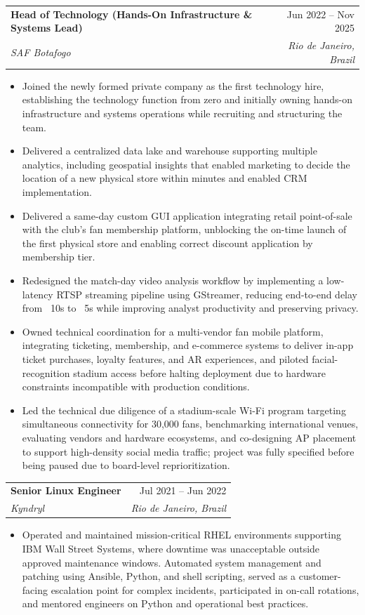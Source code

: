 \documentclass[letterpaper,11pt]{article}
\makeatletter
\newcommand{\resumeItem}[1]{
  \item\small{
    {#1 \vspace{-2pt}}
  }
}
\newcommand{\resumeSubheading}[4]{
  \vspace{-2pt}\item
    \begin{tabular*}{0.97\textwidth}[t]{l@{\extracolsep{\fill}}r}
      \textbf{#1} & #2 \\
      \textit{\small#3} & \textit{\small #4} \\
    \end{tabular*}\vspace{-7pt}
}
\newcommand{\resumeItemListStart}{\begin{itemize}}
\newcommand{\resumeItemListEnd}{\end{itemize}\vspace{-5pt}}
\makeatother
\begin{document}
    \medskip

    \resumeSubheading
      {Head of Technology (Hands-On Infrastructure \& Systems Lead)}{Jun 2022 -- Nov 2025}
      {SAF Botafogo}{Rio de Janeiro, Brazil}
      \resumeItemListStart
        \resumeItem{Joined the newly formed private company as the first technology hire, establishing the technology function from zero and initially owning hands-on infrastructure and systems operations while recruiting and structuring the team.}
        \resumeItem{Delivered a centralized data lake and warehouse supporting multiple analytics, including geospatial insights that enabled marketing to decide the location of a new physical store within minutes and enabled CRM implementation.}
        \resumeItem{Delivered a same-day custom GUI application integrating retail point-of-sale with the club’s fan membership platform, unblocking the on-time launch of the first physical store and enabling correct discount application by membership tier.}
        \resumeItem{Redesigned the match-day video analysis workflow by implementing a low-latency RTSP streaming pipeline using GStreamer, reducing end-to-end delay from ~10s to ~5s while improving analyst productivity and preserving privacy.}
        \resumeItem{Owned technical coordination for a multi-vendor fan mobile platform, integrating ticketing, membership, and e-commerce systems to deliver in-app ticket purchases, loyalty features, and AR experiences, and piloted facial-recognition stadium access before halting deployment due to hardware constraints incompatible with production conditions.}
        \resumeItem{Led the technical due diligence of a stadium-scale Wi-Fi program targeting simultaneous connectivity for 30,000 fans, benchmarking international venues, evaluating vendors and hardware ecosystems, and co-designing AP placement to support high-density social media traffic; project was fully specified before being paused due to board-level reprioritization.}
      \resumeItemListEnd

    \medskip

    \resumeSubheading
      {Senior Linux Engineer}{Jul 2021 -- Jun 2022}
      {Kyndryl}{Rio de Janeiro, Brazil}
      \resumeItemListStart
        \resumeItem{Operated and maintained mission-critical RHEL environments supporting IBM Wall Street Systems, where downtime was unacceptable outside approved maintenance windows. Automated system management and patching using Ansible, Python, and shell scripting, served as a customer-facing escalation point for complex incidents, participated in on-call rotations, and mentored engineers on Python and operational best practices.}
    \resumeItemListEnd
\end{document}
